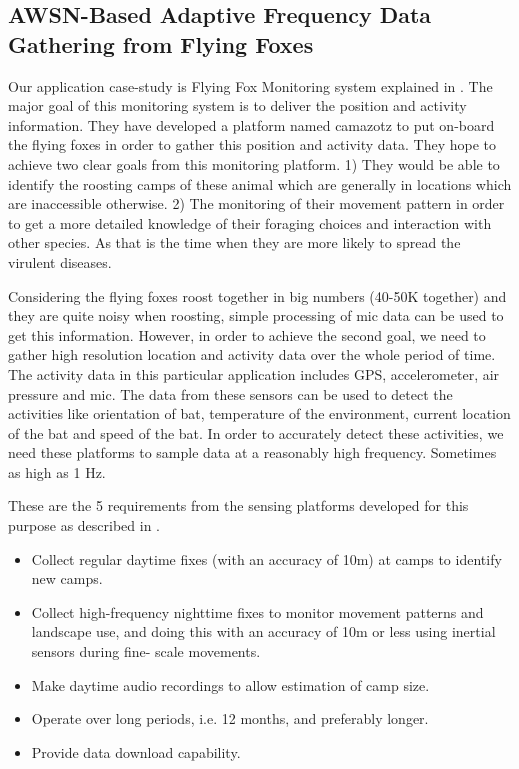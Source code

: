 \documentclass[conference]{IEEEtran}
\begin{document}
\subsection{AWSN-Based Adaptive Frequency Data Gathering from Flying Foxes} \label{case-study}
Our application case-study is Flying Fox Monitoring system explained in \cite{raja-ipsn}. The major goal of this monitoring system is to deliver the position and activity information. They have developed a platform named camazotz to put on-board the flying foxes in order to gather this position and activity data. They hope to achieve two clear goals from this monitoring platform. 1) They would be able to identify the roosting camps of these animal which are generally in locations which are inaccessible otherwise. 2) The monitoring of their movement pattern in order to get a more detailed knowledge of their foraging choices and interaction with other species. As that is the time when they are more likely to spread the virulent diseases.\

Considering the flying foxes roost together in big numbers (40-50K together) and they are quite noisy when roosting\cite{Shilton-2008}, simple processing of mic data can be used to get this information. However, in order to achieve the second goal, we need to gather high resolution location and activity data over the whole period of time. The activity data in this particular application includes GPS, accelerometer, air pressure and mic. The data from these sensors can be used to detect the activities like orientation of bat, temperature of the environment, current location of the bat and speed of the bat. In order to accurately detect these activities, we need these platforms to sample data at a reasonably high frequency. Sometimes as high as 1 Hz. \

These are the 5 requirements from the sensing platforms developed for this purpose as described in \cite{raja-ipsn}.
\begin{itemize}
\item Collect regular daytime fixes (with an accuracy of 10m) at camps to identify new camps.
\item Collect high-frequency nighttime fixes to monitor movement patterns and landscape use, and doing this with an accuracy of 10m or less using inertial sensors during fine- scale movements.
\item Make daytime audio recordings to allow estimation of camp size.
\item Operate over long periods, i.e. 12 months, and preferably longer.
\item Provide data download capability.
\end{itemize}
\end{document}
